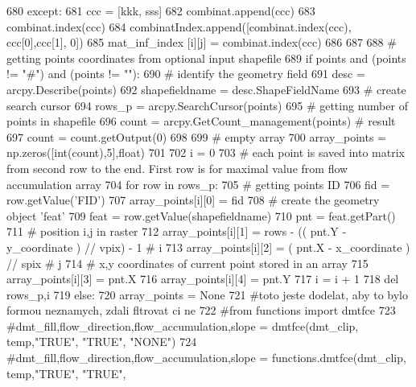 \begin{DoxyCode}
680             \textcolor{keywordflow}{except}:
681               ccc = [kkk, sss]
682               combinat.append(ccc)
683               combinat.index(ccc)
684               combinatIndex.append([combinat.index(ccc), ccc[0],ccc[1], 0])
685               mat\_inf\_index [i][j] = combinat.index(ccc)
686 
687 
688   \textcolor{comment}{# getting points coordinates from optional input shapefile
}
689   \textcolor{keywordflow}{if} points \textcolor{keywordflow}{and} (points != \textcolor{stringliteral}{"#"}) \textcolor{keywordflow}{and} (points != \textcolor{stringliteral}{""}):
690       \textcolor{comment}{# identify the geometry field
}
691       desc = arcpy.Describe(points)
692       shapefieldname = desc.ShapeFieldName
693       \textcolor{comment}{# create search cursor
}
694       rows\_p = arcpy.SearchCursor(points)
695       \textcolor{comment}{# getting number of points in shapefile
}
696       count = arcpy.GetCount\_management(points) \textcolor{comment}{# result
}
697       count = count.getOutput(0)
698 
699       \textcolor{comment}{# empty array
}
700       array\_points = np.zeros([int(count),5],float)
701 
702       i = 0
703       \textcolor{comment}{# each point is saved into matrix from second row to the end. First row is for maximal value from
       flow accumulation array
}
704       \textcolor{keywordflow}{for} row \textcolor{keywordflow}{in} rows\_p:
705         \textcolor{comment}{# getting points ID
}
706         fid = row.getValue(\textcolor{stringliteral}{'FID'})
707         array\_points[i][0] = fid
708         \textcolor{comment}{# create the geometry object 'feat'
}
709         feat = row.getValue(shapefieldname)
710         pnt = feat.getPart()
711         \textcolor{comment}{# position i,j in raster
}
712         array\_points[i][1] = rows - (( pnt.Y - y\_coordinate ) // vpix) - 1 \textcolor{comment}{# i
}
713         array\_points[i][2] = ( pnt.X - x\_coordinate ) // spix \textcolor{comment}{# j
}
714         \textcolor{comment}{# x,y coordinates of current point stored in an array
}
715         array\_points[i][3] = pnt.X
716         array\_points[i][4] = pnt.Y
717         i = i + 1
718       del rows\_p,i
719   \textcolor{keywordflow}{else}:
720     array\_points = \textcolor{keywordtype}{None}
721   \textcolor{comment}{#toto jeste dodelat, aby to bylo formou neznamych, zdali fltrovat ci ne
}
722   \textcolor{comment}{#from functions import dmtfce
}
723   \textcolor{comment}{#dmt\_fill,flow\_direction,flow\_accumulation,slope = dmtfce(dmt\_clip, temp,"TRUE", "TRUE", "NONE")
}
724   \textcolor{comment}{#dmt\_fill,flow\_direction,flow\_accumulation,slope = functions.dmtfce(dmt\_clip, temp,"TRUE", "TRUE",
}
\end{DoxyCode}
